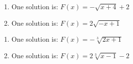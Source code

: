 \documentclass{ximera}
\begin{document}
\begin{multicols}{2}

\begin{enumerate}
\setcounter{enumi}{\value{HW}}

\item One solution is: $F(x) = -\sqrt{x+4}+2$


\item One solution is: $F(x) =2\sqrt{-x+1}$

\setcounter{HW}{\value{enumi}}

\end{enumerate}

\end{multicols}

\begin{multicols}{2}
\begin{enumerate}
\setcounter{enumi}{\value{HW}}

\item One solution is:  $F(x) = -\sqrt[3]{2x+1}$

\item One solution is:  $F(x) =2\sqrt[3]{x-1}-2$

\setcounter{HW}{\value{enumi}}
\end{enumerate}
\end{multicols}
\end{document}
